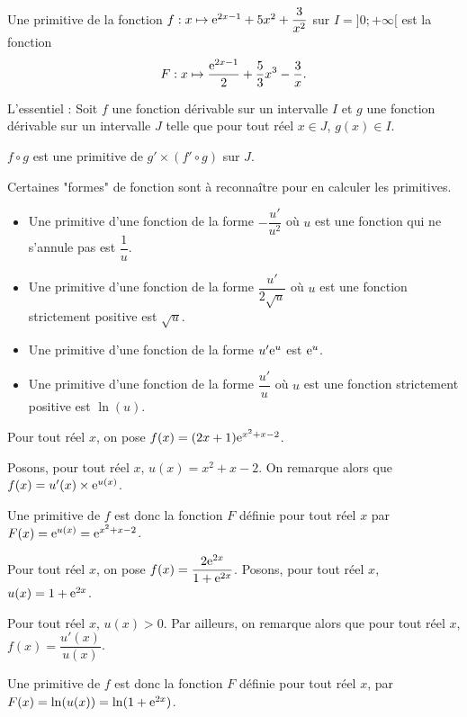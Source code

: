 \documentclass[11pt,fleqn, openany]{book} %
\begin{document}
\begin{example}Une primitive de la fonction $f:x\mapsto \mathrm{e}^{2x-1}+5x^2+\dfrac{3}{x^2}$ sur $I=]0;+\infty[$ est la fonction
\[F:x\mapsto \dfrac{\mathrm{e}^{2x-1}}{2}+\dfrac{5}{3}x^3-\dfrac{3}{x}.\]\end{example}



\begin{proposition}L'essentiel : Soit $f$ une fonction dérivable sur un intervalle $I$ et $g$ une fonction dérivable sur un intervalle $J$ telle que pour tout réel $x\in J$, $g(x)\in I$.

$f \circ g$ est une primitive de $g' \times (f' \circ g)$ sur $J$.\end{proposition}

Certaines "formes" de fonction sont à reconnaître pour en calculer les primitives. 

\begin{itemize}
\item Une primitive d'une fonction de la forme $-\dfrac{u'}{u^2}$ où $u$ est une fonction qui ne s'annule pas est $\dfrac{1}{u}$.
\vskip10pt
\item Une primitive d'une fonction de la forme $\dfrac{u'}{2\sqrt{u}}$ où $u$ est une fonction strictement positive est $\sqrt{u}$.
\vskip10pt
\item Une primitive d'une fonction de la forme $u'\mathrm{e}^u$ est $\mathrm{e}^u$.
\vskip10pt
\item Une primitive d'une fonction de la forme $\dfrac{u'}{u}$ où $u$ est une fonction strictement positive est $\ln(u)$.
\end{itemize}


\begin{example} Pour tout réel $x$, on pose $f(x)=(2x+1)\mathrm{e}^{x^2+x-2}$.

Posons, pour tout réel $x$, $u(x)=x^2+x-2$. On remarque alors que $f(x)=u'(x) \times \mathrm{e}^{u(x)}$.

Une primitive de $f$ est donc la fonction $F$ définie pour tout réel $x$ par $F(x)=\mathrm{e}^{u(x)}=\mathrm{e}^{x^2+x-2}$.\end{example}

\begin{example}Pour tout réel $x$, on pose $f(x)=\dfrac{2\mathrm{e}^{2x}}{1+\mathrm{e}^{2x}}$. Posons, pour tout réel $x$, $u(x)=1+\mathrm{e}^{2x}$. 

Pour tout réel $x$, $u(x)>0$. Par ailleurs, on remarque alors que pour tout réel $x$, $f(x)=\dfrac{u'(x)}{u(x)}$. 

Une primitive de $f$ est donc la fonction $F$ définie pour tout réel $x$, par $F(x)=\ln(u(x))=\ln(1+\mathrm{e}^{2x})$.\end{example}
\end{document}
